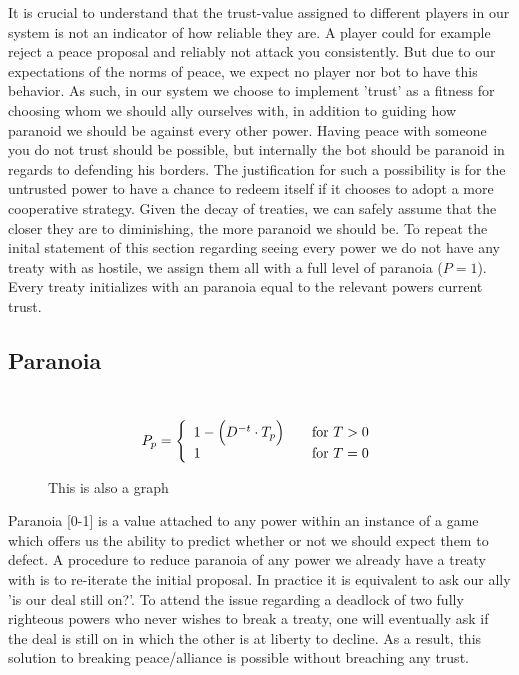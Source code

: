 \documentclass[a4paper]{article} %
\begin{document}
It is crucial to understand that the trust-value assigned to different players in our system is not an indicator of how reliable they are. A player could for example reject a peace proposal and reliably not attack you consistently. But due to our expectations of the norms of peace, we expect no player nor bot to have this behavior. As such, in our system we choose to implement 'trust' as a fitness for choosing whom we should ally ourselves with, in addition to guiding how paranoid we should be against every other power. Having peace with someone you do not trust should be possible, but internally the bot should be paranoid in regards to defending his borders. The justification for such a possibility is for the untrusted power to have a chance to redeem itself if it chooses to adopt a more cooperative strategy. Given the decay of treaties, we can safely assume that the closer they are to diminishing, the more paranoid we should be. To repeat the inital statement of this section regarding seeing every power we do not have any treaty with as hostile, we assign them all with a full level of paranoia ($P = 1$). Every treaty initializes with an paranoia equal to the relevant powers current trust. 

\subsection{Paranoia}
\
  \[ P_p = \left\{ 
  \begin{array}{l l}
    1 - \Big( D^{-t} \cdot T_p \Big) & \quad \text{for $T > 0$} \\
 	1 & \quad \text{for $T = 0$}
    
  \end{array} \right.\]
\begin{figure}[H]
\centering
{}
\caption{This is also a graph}
\label{fig:graph2}
\end{figure}


Paranoia [0-1]  is a value attached to any power within an instance of a game which offers us the ability to predict whether or not we should expect them to defect. A procedure to reduce paranoia of any power we already have a treaty with is to re-iterate the initial proposal. In practice it is equivalent to ask our ally 'is our deal still on?'. To attend the issue regarding a deadlock of two fully righteous powers who never wishes to break a treaty, one will eventually ask if the deal is still on in which the other is at liberty to decline. As a result, this solution to breaking peace/alliance is possible without breaching any trust.
\end{document}
